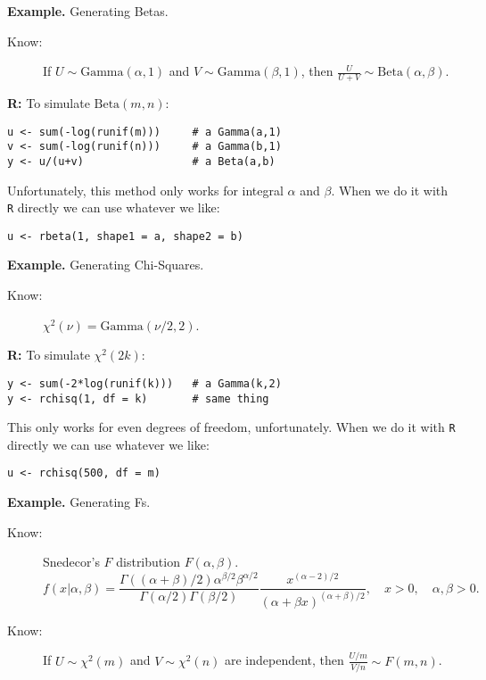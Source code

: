 \documentclass[11pt,english]{scrbook}
\begin{document}
\begin{enumerate}
\textbf{Example.} Generating Betas.

\begin{description}
\item[{Know:}] If \(U\sim\mathrm{Gamma}(\alpha,1)\) and \(V\sim\mathrm{Gamma}(\beta,1)\), then \(\frac{U}{U+V}\sim\mathrm{Beta}(\alpha,\beta)\).
\end{description}

\textbf{R:} To simulate \(\mathrm{Beta}(m,n)\):
\begin{verbatim}
u <- sum(-log(runif(m)))     # a Gamma(a,1)
v <- sum(-log(runif(n)))     # a Gamma(b,1)
y <- u/(u+v)                 # a Beta(a,b)
\end{verbatim}

Unfortunately, this method only works for integral \(\alpha\) and \(\beta\).  When we do it with \texttt{R} directly we can use whatever we like:
\begin{verbatim}
u <- rbeta(1, shape1 = a, shape2 = b)
\end{verbatim}


\textbf{Example.} Generating Chi-Squares.

\begin{description}
\item[{Know:}] \(\chi^{2}(\nu)=\mathrm{Gamma}(\nu/2,2)\).
\end{description}

\textbf{R:} To simulate \(\chi^{2}(2k)\):
\begin{verbatim}
y <- sum(-2*log(runif(k)))   # a Gamma(k,2)
y <- rchisq(1, df = k)       # same thing
\end{verbatim}

This only works for even degrees of freedom, unfortunately. When we do it with \texttt{R} directly we can use whatever we like:
\begin{verbatim}
u <- rchisq(500, df = m)
\end{verbatim}


\textbf{Example.} Generating Fs.

\begin{description}
\item[{Know:}] Snedecor's \(F\) distribution \(F(\alpha,\beta)\).
\[
  f(x|\alpha,\beta)=\frac{\Gamma((\alpha+\beta)/2)\alpha^{\beta/2}\beta^{\alpha/2}}{\Gamma(\alpha/2)\Gamma(\beta/2)}\frac{x^{(\alpha-2)/2}}{(\alpha+\beta x)^{(\alpha+\beta)/2}},\quad x>0,\quad\alpha,\beta>0.
  \]

\item[{Know:}] If \(U\sim\chi^{2}(m)\) and \(V\sim\chi^{2}(n)\) are independent, then \(\frac{U/m}{V/n}\sim F(m,n)\).
\end{description}


\end{enumerate}
\end{document}
